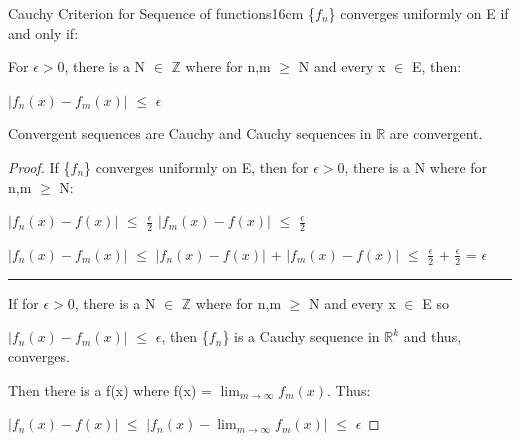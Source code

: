     \vspace{0.5cm}



    \begin{wtheorem}{Cauchy Criterion for Sequence of functions}{16cm}
        \{$f_n$\} converges uniformly on E if and only if:
        
        \hspace{0.5cm}
        For $\epsilon > 0$, there is a N $\in$ $\mathbb{Z}$ where for n,m $\geq$ N
        and every x $\in$ E, then:
        
        \hspace{1cm}
        $|f_n(x) - f_m(x)|$ $\leq$ $\epsilon$        
    \end{wtheorem}


    \begin{intuition}
        Convergent sequences are Cauchy
        and Cauchy sequences in $\mathbb{R}$ are convergent.
    \end{intuition}

    \vspace{0.1cm}

    \begin{proof}
        If \{$f_n$\} converges uniformly on E, then for $\epsilon > 0$, there is a N
        where for n,m $\geq$ N:

        \hspace{0.5cm}
        $|f_n(x) - f(x)|$ $\leq$ $\frac{\epsilon}{2}$
        \hspace{1cm}
        $|f_m(x) - f(x)|$ $\leq$ $\frac{\epsilon}{2}$

        \hspace{0.5cm}
        $|f_n(x) - f_m(x)|$
        $\leq$ $|f_n(x) - f(x)|$ + $|f_m(x) - f(x)|$
        $\leq$ $\frac{\epsilon}{2}$ + $\frac{\epsilon}{2}$
        = $\epsilon$

        \rule[0.1cm]{15cm}{0.01cm}

        If for $\epsilon > 0$, there is a N $\in$ $\mathbb{Z}$ where for n,m $\geq$ N
        and every x $\in$ E so

        $|f_n(x) - f_m(x)|$ $\leq$ $\epsilon$, then \{$f_n$\} is a Cauchy sequence
        in $\mathbb{R}^k$ and thus, converges.

        Then there is a f(x) where f(x) = $\lim_{m \rightarrow \infty} f_m(x)$. Thus:

        \hspace{0.5cm}
        $|f_n(x) - f(x)|$
        $\leq$ $|f_n(x) - \lim_{m \rightarrow \infty} f_m(x)|$
        $\leq$ $\epsilon$
    \end{proof}

